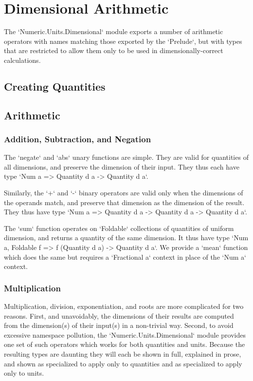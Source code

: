 \documentclass[11pt]{report}
\begin{document}
\chapter{Dimensional Arithmetic}

The `Numeric.Units.Dimensional` module exports a number of arithmetic operators with names matching those
exported by the `Prelude`, but with types that are restricted to allow them only to be used in dimensionally-correct
calculations.

\section{Creating Quantities}


\section{Arithmetic}

\subsection{Addition, Subtraction, and Negation}

The `negate` and `abs` unary functions are simple. They are valid for quantities of all dimensions, and preserve the
dimension of their input. They thus each have type `Num a => Quantity d a -> Quantity d a`.

Similarly, the `+` and `-` binary operators are valid only when the dimensions of the operands match, and preserve that
dimension as the dimension of the result. They thus have type `Num a => Quantity d a -> Quantity d a -> Quantity d a`.

The `sum` function operates on `Foldable` collections of quantities of uniform dimension, and returns a quantity of
the same dimension. It thus have type `Num a, Foldable f => f (Quantity d a) -> Quantity d a`. We provide a `mean` function
which does the same but requires a `Fractional a` context in place of the `Num a` context.

\subsection{Multiplication}

Multiplication, division, exponentiation, and roots are more complicated for two reasons. First, and unavoidably, the dimensions of their results are computed
from the dimension(s) of their input(s) in a non-trivial way. Second, to avoid excessive namespace pollution, the `Numeric.Units.Dimensional` module provides
one set of such operators which works for both quantities and units. Because the resulting types are daunting they will each be shown in full, explained in prose,
and shown as specialized to apply only to quantities and as specialized to apply only to units.
\end{document}
